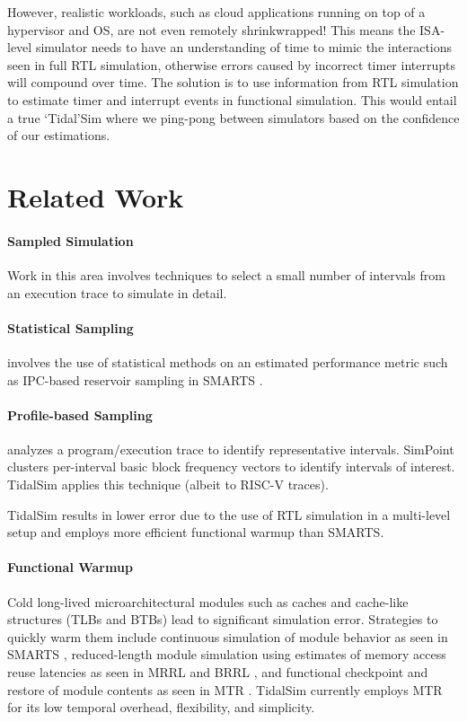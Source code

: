 \documentclass[sigplan,nonacm,10pt]{acmart}
\begin{document}
However, realistic workloads, such as cloud applications running on top of a hypervisor and OS, are not even remotely shrinkwrapped!
This means the ISA-level simulator needs to have an understanding of time to mimic the interactions seen in full RTL simulation, otherwise errors caused by incorrect timer interrupts will compound over time.
The solution is to use information from RTL simulation to estimate timer and interrupt events in functional simulation.
This would entail a true `Tidal'Sim where we ping-pong between simulators based on the confidence of our estimations.

\section{Related Work}

\paragraph{Sampled Simulation} Work in this area involves techniques to select a small number of intervals from an execution trace to simulate in detail\cite{sampled_simulation_survey}.

\paragraph{Statistical Sampling} involves the use of statistical methods on an estimated performance metric such as IPC-based reservoir sampling in SMARTS \cite{smarts}.

\paragraph{Profile-based Sampling} analyzes a program/execution trace to identify representative intervals. SimPoint \cite{simpoint3} clusters per-interval basic block frequency vectors to identify intervals of interest. TidalSim applies this technique (albeit to RISC-V traces).

TidalSim results in lower error due to the use of RTL simulation in a multi-level setup and employs more efficient functional warmup than SMARTS.

\paragraph{Functional Warmup} Cold long-lived microarchitectural modules such as caches and cache-like structures (TLBs and BTBs) lead to significant simulation error. Strategies to quickly warm them include continuous simulation of module behavior as seen in SMARTS \cite{smarts}, reduced-length module simulation using estimates of memory access reuse latencies as seen in MRRL \cite{haskins2003memory} and BRRL \cite{eeckhout2005blrl}, and functional checkpoint and restore of module contents as seen in MTR \cite{barr2005accelerating}. TidalSim currently employs MTR for its low temporal overhead, flexibility, and simplicity.
\end{document}
